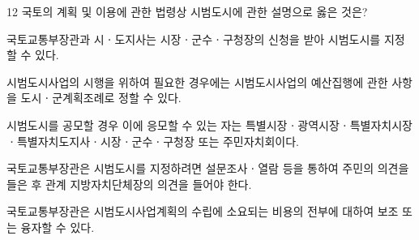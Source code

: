\begin{question}{12}
국토의 계획 및 이용에 관한 법령상 시범도시에 관한 설명으로 옳은 것은?
\begin{choices}
  \item 국토교통부장관과 시ㆍ도지사는 시장ㆍ군수ㆍ구청장의 신청을 받아 시범도시를 지정할 수 있다.
  \item 시범도시사업의 시행을 위하여 필요한 경우에는 시범도시사업의 예산집행에 관한 사항을 도시ㆍ군계획조례로 정할 수 있다.
  \item 시범도시를 공모할 경우 이에 응모할 수 있는 자는 특별시장ㆍ광역시장ㆍ특별자치시장ㆍ특별자치도지사ㆍ시장ㆍ군수ㆍ구청장 또는 주민자치회이다.
  \item 국토교통부장관은 시범도시를 지정하려면 설문조사ㆍ열람 등을 통하여 주민의 의견을 들은 후 관계 지방자치단체장의 의견을 들어야 한다.
  \item 국토교통부장관은 시범도시사업계획의 수립에 소요되는 비용의 전부에 대하여 보조 또는 융자할 수 있다.
\end{choices}
\end{question}
